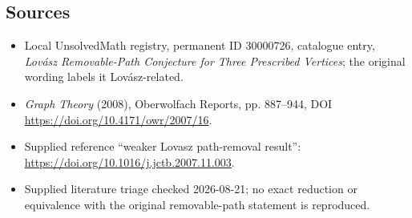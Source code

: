 \documentclass[11pt]{article}
\begin{document}
\subsection{Sources}
\begin{itemize}
\item Local UnsolvedMath registry, permanent ID 30000726, catalogue entry, \emph{Lov\'asz Removable-Path Conjecture for Three Prescribed Vertices}; the original wording labels it Lov\'asz-related.
\item \emph{Graph Theory} (2008), Oberwolfach Reports, pp. 887--944, DOI \url{https://doi.org/10.4171/owr/2007/16}.
\item Supplied reference ``weaker Lovasz path-removal result'': \url{https://doi.org/10.1016/j.jctb.2007.11.003}.
\item Supplied literature triage checked 2026-08-21; no exact reduction or equivalence with the original removable-path statement is reproduced.
\end{itemize}
\end{document}
